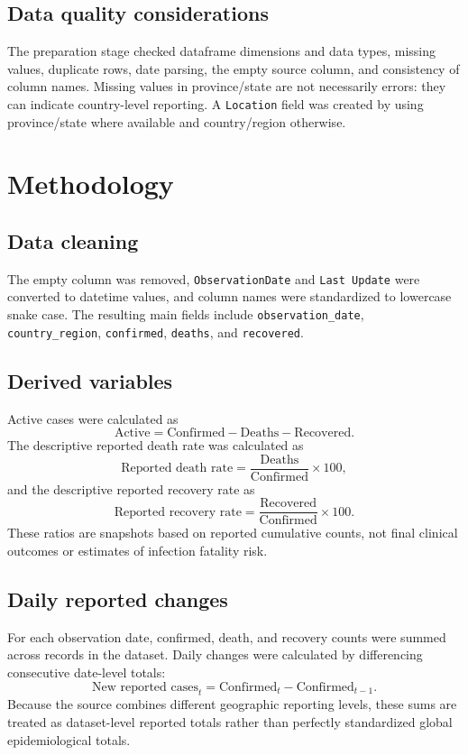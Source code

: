 \documentclass[11pt,a4paper]{article}
\begin{document}
\subsection{Data quality considerations}
The preparation stage checked dataframe dimensions and data types, missing values, duplicate rows, date parsing, the empty source column, and consistency of column names. Missing values in province/state are not necessarily errors: they can indicate country-level reporting. A \texttt{Location} field was created by using province/state where available and country/region otherwise.

\section{Methodology}
\subsection{Data cleaning}
The empty column was removed, \texttt{ObservationDate} and \texttt{Last Update} were converted to datetime values, and column names were standardized to lowercase snake case. The resulting main fields include \texttt{observation\_date}, \texttt{country\_region}, \texttt{confirmed}, \texttt{deaths}, and \texttt{recovered}.

\subsection{Derived variables}
Active cases were calculated as
\[
\text{Active}=\text{Confirmed}-\text{Deaths}-\text{Recovered}.
\]
The descriptive reported death rate was calculated as
\[
\text{Reported death rate}=\frac{\text{Deaths}}{\text{Confirmed}}\times 100,
\]
and the descriptive reported recovery rate as
\[
\text{Reported recovery rate}=\frac{\text{Recovered}}{\text{Confirmed}}\times 100.
\]
These ratios are snapshots based on reported cumulative counts, not final clinical outcomes or estimates of infection fatality risk.

\subsection{Daily reported changes}
For each observation date, confirmed, death, and recovery counts were summed across records in the dataset. Daily changes were calculated by differencing consecutive date-level totals:
\[
\text{New reported cases}_t=\text{Confirmed}_t-\text{Confirmed}_{t-1}.
\]
Because the source combines different geographic reporting levels, these sums are treated as dataset-level reported totals rather than perfectly standardized global epidemiological totals.
\end{document}
